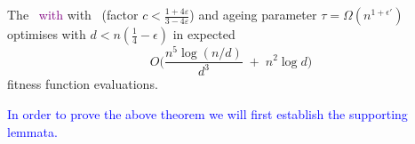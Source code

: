 


\begin{theorem}
	The %
	\textcolor{purple}{\firstBest~with} \IPHfcm{} with \linHD\ (factor $c<\tfrac{1+4\varepsilon}{3-4\varepsilon}$) and ageing parameter $\tau=\Omega(n^{1+\epsilon'})$
	optimises \cliff{} with $d<n(\tfrac{1}{4}-\epsilon)$ in expected
	\[
	O\!\Big(\frac{n^{5}\log(n/d)}{d^{3}} \;+\; n^{2}\log d\Big)
	\]
	fitness function evaluations.
\end{theorem}

\textcolor{blue}{In order to prove the above theorem we will first establish the supporting lemmata.}




